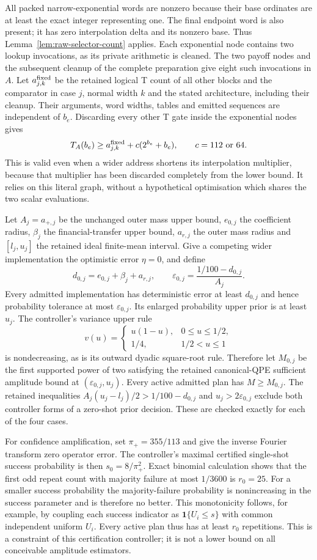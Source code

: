 All packed narrow-exponential words are nonzero because their base
ordinates are at least the exact integer representing one. The final
endpoint word is also present; it has zero interpolation delta and its
nonzero base. Thus Lemma~\ref{lem:raw-selector-count} applies.
Each exponential node contains two lookup invocations, as its private
arithmetic is cleaned. The two payoff nodes and the subsequent cleanup
of the complete preparation give eight such invocations in $A$.
Let $a^{\rm fixed}_{j,k}$ be the retained logical T count of all other
blocks and the comparator in case $j$, normal width $k$ and the stated
architecture, including their cleanup. Their arguments, word widths,
tables and emitted sequences are independent of $b_e$. Discarding every
other T gate inside the exponential nodes gives
\[
 T_A(b_e)\geq a^{\rm fixed}_{j,k}+c(2^{b_e}+b_e),
 \qquad c=112\text{ or }64.
\]
This is valid even when a wider address shortens its interpolation
multiplier, because that multiplier has been discarded completely from
the lower bound. It relies on this literal graph, without a hypothetical
optimisation which shares the two scalar evaluations.

Let $A_j=a_{+,j}$ be the unchanged outer mass upper bound, $e_{0,j}$
the coefficient radius, $\beta_j$ the financial-transfer upper bound,
$a_{r,j}$ the outer mass radius and $[l_j,u_j]$ the retained ideal
finite-mean interval. Give a competing wider implementation the
optimistic error $\eta=0$, and define
\[
 d_{0,j}=e_{0,j}+\beta_j+a_{r,j},\qquad
 \varepsilon_{0,j}=\frac{1/100-d_{0,j}}{A_j}.
\]
Every admitted implementation has deterministic error at least $d_{0,j}$
and hence probability tolerance at most $\varepsilon_{0,j}$. Its enlarged
probability upper prior is at least $u_j$. The controller's variance
upper rule
\[
 v(u)=\begin{cases}u(1-u),&0\leq u\leq1/2,\\1/4,&1/2<u\leq1\end{cases}
\]
is nondecreasing, as is its outward dyadic square-root rule. Therefore
let $M_{0,j}$ be the first supported power of two satisfying the retained
canonical-QPE sufficient amplitude bound at $(\varepsilon_{0,j},u_j)$.
Every active admitted plan has $M\geq M_{0,j}$. The retained inequalities
$A_j(u_j-l_j)/2>1/100-d_{0,j}$ and $u_j>2\varepsilon_{0,j}$ exclude
both controller forms of a zero-shot prior decision. These are checked
exactly for each of the four cases.

For confidence amplification, set $\pi_+=355/113$ and give the inverse
Fourier transform zero operator error. The controller's maximal certified
single-shot success probability is then $s_0=8/\pi_+^2$. Exact binomial
calculation shows that the first odd repeat count with majority failure
at most $1/3600$ is $r_0=25$. For a smaller success probability the
majority-failure probability is nonincreasing in the success parameter
and is therefore no better. This monotonicity follows, for example, by
coupling each success indicator as $\mathbf1\{U_i\leq s\}$ with common
independent uniform $U_i$. Every active plan thus has at least $r_0$
repetitions. This is a constraint of this certification controller;
it is not a lower bound on all conceivable amplitude estimators.

